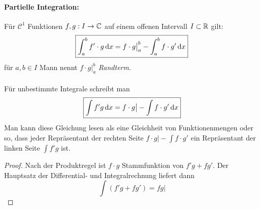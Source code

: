 \begin{example}
\paragraph{Partielle Integration:} Für $\mathcal{C}^1$ Funktionen $f,g:I\to \mathbb{C}$ auf einem offenen Intervall $I \subset \mathbb{R}$ gilt:
\begin{equation*}
	\boxed{
	\int_a^b f' \cdot g \, \mathrm{d} x = f\cdot g \big\vert^b_a - \int^b_a f \cdot g' \, \mathrm{d} x	
	}
\end{equation*}
für $a,b \in I$ Mann nennt $f\cdot g \vert^b_a$ \emph{Randterm}. \\\\
Für unbestimmte Integrale schreibt man
\begin{equation*}
	\boxed{
	\int f' g\, \mathrm{d} x = f \cdot g \big\vert -  \int f \cdot g' \, \mathrm{d} x
	}
\end{equation*}
Man kann diese Gleichung lesen als eine Gleichheit von Funktionenmengen oder so, dass jeder Repräsentant der rechten Seite $f \cdot g \big\vert -  \int f \cdot g'$ ein Repräsentant der linken Seite $\int f' g$ ist.
\begin{proof}
Nach der Produktregel ist $f \cdot g$ Stammfunktion von $f'g+fg'$. Der Hauptsatz der Differential- und Integralrechnung liefert dann 
$$ \int (f' g + fg') = fg \big\vert$$
\end{proof}


\end{example}
